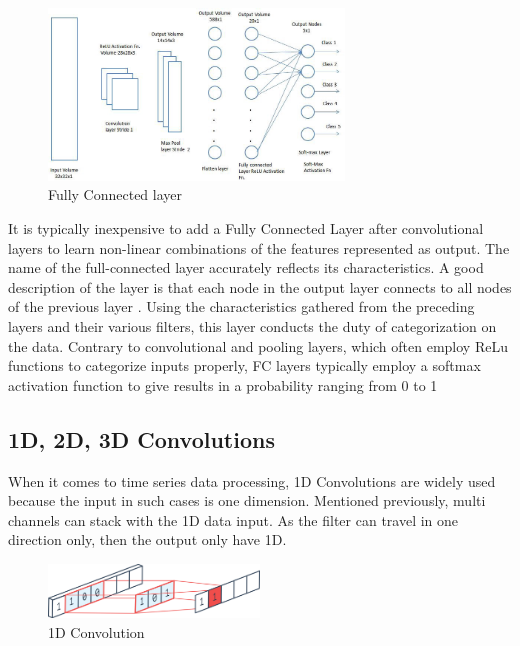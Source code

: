 \documentclass[a4paper, 12pt]{article}
\begin{document}
\begin{figure}[H]
    \centering
    \includegraphics[width=0.7\textwidth]{Fully connected.jpeg}
    \caption{Fully Connected layer \citep{towardScienceCnn}}
    \label{Figure FC layer}
\end{figure}

It is typically inexpensive to add a Fully Connected Layer after convolutional layers to learn non-linear combinations of the features represented as output. The name of the full-connected layer accurately reflects its characteristics. A good description of the layer is that each node in the output layer connects to all nodes of the previous layer \citep{8308186}. Using the characteristics gathered from the preceding layers and their various filters, this layer conducts the duty of categorization on the data. Contrary to convolutional and pooling layers, which often employ ReLu functions to categorize inputs properly, FC layers typically employ a softmax activation function to give results in a probability ranging from 0 to 1 \citep{ibmConvNet}

\subsection{1D, 2D, 3D Convolutions}
When it comes to time series data processing, 1D Convolutions are widely used because the input in such cases is one dimension. Mentioned previously, multi channels can stack with the 1D data input.
As the filter can travel in one direction only, then the output only have 1D.

\begin{figure}[H]
    \centering
    \includegraphics[width=0.5\textwidth]{1D Conv.png}
    \caption{1D Convolution}
    \label{Figure 1D}
\end{figure}
\end{document}
